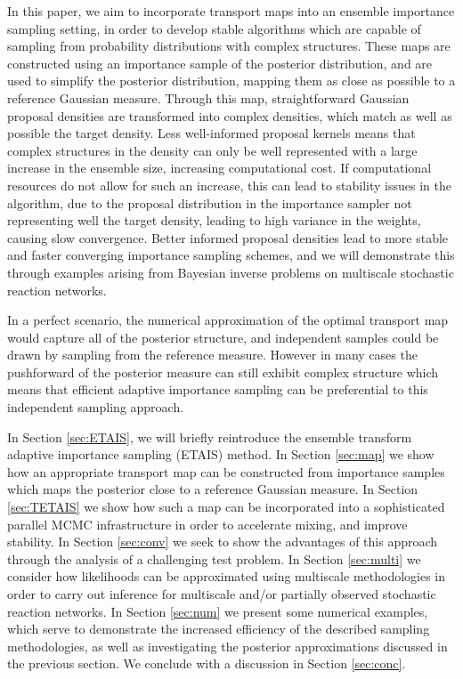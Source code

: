 \documentclass[final]{siamltex}
\newcommand{\edit}[1]{#1}
\begin{document}

In this paper, we aim to incorporate transport maps into an ensemble
importance sampling setting, in order to develop stable algorithms which are
capable of sampling from probability distributions with complex
structures. These maps are constructed using an importance sample of
the posterior distribution, and are used to simplify the posterior
distribution, mapping them as close as possible to a reference
Gaussian measure. Through this map, straightforward Gaussian proposal
densities are transformed into complex densities, which match as well
as possible the target density. Less well-informed proposal kernels means that complex
structures in the density can only be well represented with a large
increase in the ensemble size, increasing computational cost. If
computational resources do not allow for such an increase, this can
lead to stability issues in the algorithm, due to the proposal
distribution in the importance sampler not representing well the
target density, leading to high variance in the weights, causing slow
convergence. Better informed proposal densities
lead to more stable and faster converging importance sampling
schemes, and we will demonstrate this through examples
arising from Bayesian inverse problems on multiscale stochastic
reaction networks.

\edit{In a perfect scenario, the numerical
  approximation of the optimal transport map would capture all of the
  posterior structure, and independent samples could be drawn by
  sampling from the reference measure. However in many cases the pushforward of the posterior measure can still exhibit complex structure
  which means that efficient adaptive importance sampling can be
  preferential to this independent sampling approach.}




In Section \ref{sec:ETAIS}, we will briefly reintroduce the ensemble
transform adaptive importance sampling (ETAIS) method. In Section \ref{sec:map} we show how an appropriate transport map can
be constructed from importance samples which maps the posterior close
to a reference Gaussian measure. In Section \ref{sec:TETAIS} we show
how such a map can be incorporated into a sophisticated parallel MCMC
infrastructure in order to accelerate mixing, and improve stability. In Section
\ref{sec:conv} we seek to show the advantages of this approach through
the analysis of a challenging test problem. In Section
\ref{sec:multi} we consider how likelihoods can be approximated using
 multiscale methodologies in order to carry out inference for
multiscale and/or partially observed stochastic reaction networks. In
Section \ref{sec:num} we present some numerical examples, which serve
to demonstrate the increased efficiency of the described sampling
methodologies, as well as investigating the posterior approximations
discussed in the previous section. We conclude with a discussion in
Section \ref{sec:conc}.
\end{document}
